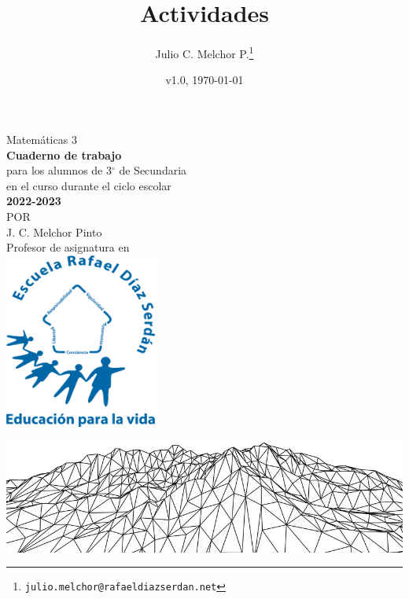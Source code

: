 \documentclass[]{book}
\title{Actividades}
\author{Julio C. Melchor P.\thanks{{\tt julio.melchor@rafaeldiazserdan.net}}}
\date{v1.0, \today}
\begin{document}
\pagestyle{empty}
\begin{center}
    {\Huge Matem\'aticas 3}\\
    \vspace{1cm}
    \normalsize
    \textbf{\large Cuaderno de trabajo}\\
    para los alumnos de 3$^\circ$ de  Secundaria\\
    en el curso durante el ciclo escolar\\
    \textbf{2022-2023}\\
    \vspace{2.2cm}
    \small POR\\
    \Large J. C. Melchor Pinto\\[0.5em]
    \normalsize Profesor de asignatura en\\
    \vspace{1cm}
    \includegraphics[width=5cm]{../Unidad 2/Images/LOGO_RDS_nobg}
\end{center}
\vspace{2.5cm}
%
\hspace{-16mm}
\includegraphics[width=\paperwidth]{../Unidad 2/Images/cover_bg}
\end{document}
